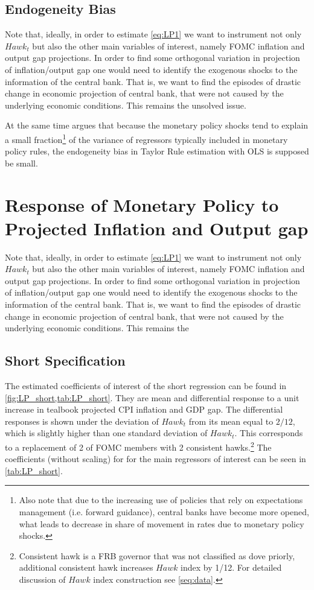 \documentclass[11pt]{article}
\begin{document}
\subsection{Endogeneity Bias}

Note that, ideally, in order to estimate \vref{eq:LP1} we want to instrument not only $\mathit{Hawk}_{t}$ but also the other main variables of interest, namely FOMC inflation and output gap projections. 
In order to find some orthogonal variation in projection of inflation/output gap one would need to identify the exogenous shocks to the information of the central bank. 
That is, we want to find the episodes of drastic change in economic projection of central bank, that were not caused by the underlying economic conditions. 
This remains the unsolved issue.

At the same time \citet{Carvalho2021} argues that because the monetary policy shocks tend to explain a small fraction\footnote{Also note that due to the increasing use of policies that rely on expectations management (i.e. forward guidance), central banks have become more opened, what leads to decrease in share of movement in rates due to monetary policy shocks.} of the variance of regressors typically included in monetary policy rules, the endogeneity bias in Taylor Rule estimation with OLS is supposed be small.

\section{Response of Monetary Policy to Projected Inflation and Output gap}

Note that, ideally, in order to estimate \vref{eq:LP1} we want to instrument not only $\mathit{Hawk}_{t}$ but also the other main variables of interest, namely FOMC inflation and output gap projections. 
In order to find some orthogonal variation in projection of inflation/output gap one would need to identify the exogenous shocks to the information of the central bank. 
That is, we want to find the episodes of drastic change in economic projection of central bank, that were not caused by the underlying economic conditions. 
This remains the 


\subsection{Short Specification}

The estimated coefficients of interest of the short regression can be found in \vref{fig:LP_short,tab:LP_short}. 
They are mean and differential response to a unit increase in tealbook projected CPI inflation and GDP gap. 
The differential responses is shown under the deviation of $\mathit{Hawk}_t$ from its mean equal to $2/12$, which is slightly higher than one standard deviation of $\mathit{Hawk}_t$. 
This corresponds to a replacement of 2 of FOMC members with 2 consistent hawks.\footnote{Consistent hawk is a FRB governor that was not classified as dove priorly, additional consistent hawk increases $\mathit{Hawk}$ index by 1/12. For detailed discussion of $\mathit{Hawk}$ index construction see \vref{seq:data}.}
The coefficients (without scaling) for for the main regressors of interest can be seen in \vref{tab:LP_short}. 
\end{document}
